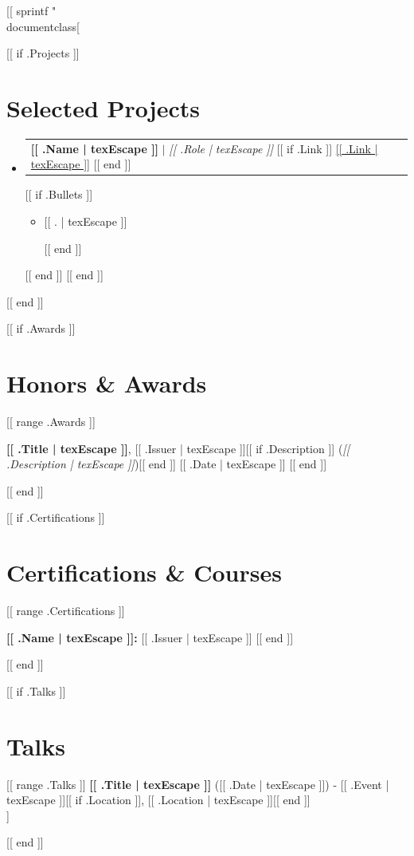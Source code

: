 [[ sprintf "\\documentclass[%
\makeatletter
\newcommand{\resumeItem}[1]{
  \item\small{
    {#1 \vspace{-2pt}}
  }
}
\newcommand{\resumeProjectHeading}[2]{
    \item
    \begin{tabular*}{0.97\textwidth}{l@{\extracolsep{\fill}}r}
      \small#1 & #2 \\
    \end{tabular*}\vspace{-7pt}
}
\newcommand{\resumeSubHeadingListStart}{\begin{itemize}[leftmargin=0.15in, label={}]}
\newcommand{\resumeSubHeadingListEnd}{\end{itemize}}
\newcommand{\resumeItemListStart}{\begin{itemize}}
\newcommand{\resumeItemListEnd}{\end{itemize}\vspace{-5pt}}
\makeatother
\begin{document}
[[ if .Projects ]]
\section{Selected Projects}
    \resumeSubHeadingListStart
      [[ range .Projects ]]
      \resumeProjectHeading
          {\textbf{[[ .Name | texEscape ]]} $|$ \emph{[[ .Role | texEscape ]]} [[ if .Link ]] \href{[[ .Link | texEscape ]]}{[[ .Link | texEscape ]]} [[ end ]]} {}
          [[ if .Bullets ]]
          \resumeItemListStart
            [[ range texLines .Bullets ]]\resumeItem{[[ . | texEscape ]]}
            [[ end ]]
          \resumeItemListEnd
          [[ end ]]
      [[ end ]]
    \resumeSubHeadingListEnd
[[ end ]]


[[ if .Awards ]]
\section{Honors \& Awards}
 \begin{itemize}[leftmargin=0.15in, label={}]
    \small{
     [[ range .Awards ]]
     \item \textbf{[[ .Title | texEscape ]]}, [[ .Issuer | texEscape ]][[ if .Description ]] (\textit{[[ .Description | texEscape ]]})[[ end ]] \hfill [[ .Date | texEscape ]]
     [[ end ]]
    }
 \end{itemize}
[[ end ]]


[[ if .Certifications ]]
\section{Certifications \& Courses}
 \begin{itemize}[leftmargin=0.15in, label={}]
    \small{
     [[ range .Certifications ]]
     \item \textbf{[[ .Name | texEscape ]]:} [[ .Issuer | texEscape ]]
     [[ end ]]
    }
 \end{itemize}
[[ end ]]

[[ if .Talks ]]
\section{Talks}
 \begin{itemize}[leftmargin=0.15in, label={}]
    \small{\item{
     [[ range .Talks ]]
     \textbf{[[ .Title | texEscape ]]} ([[ .Date | texEscape ]]) - [[ .Event | texEscape ]][[ if .Location ]], [[ .Location | texEscape ]][[ end ]] \\
     [[ end ]]
    }}
 \end{itemize}
[[ end ]]
\end{document}
